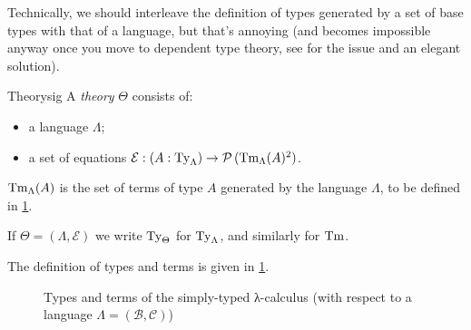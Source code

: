 \documentclass[10pt,a4paper]{notes-template}
\begin{document}
Technically, we should interleave
the definition of types generated by a set of base types
with that of a language, but that's annoying
(and becomes impossible anyway once you move to dependent type theory, see
\eg \textcite{Bezem2021} for the issue and an elegant solution).

\begin{definition}{Theory}{sig}
  A \emph{theory} \(\Theta\) consists of:
  \begin{itemize}
    \item a language \(\Lambda\);
    \item a set of equations \(\mathcal{E} \mathrel{:}
      (A : \operatorname{Ty}_{\Lambda}) \to \operatorname{\mathcal{P}}{(\operatorname{Tm}_{\Lambda}(A)^2)}\).
  \end{itemize}
  \(\operatorname{Tm}_{\Lambda}(A)\) is the set of terms of type \(A\)
  generated by the language \(\Lambda\), to be defined in \cref{fig:stlc}.

  If \(\Theta = (\Lambda,\mathcal{E})\) we write
  \(\operatorname{Ty}_{\Theta}\) for \(\operatorname{Ty}_{\Lambda}\), and similarly for \(\operatorname{Tm}\).
\end{definition}

The definition of types and terms is given in \cref{fig:stlc}.

\begin{figure}
\caption{Types and terms of the simply-typed λ-calculus (with respect to a language
  \(\Lambda = (\mathcal{B},\mathcal{C})\))}
\label{fig:stlc}
\end{figure}
\end{document}
